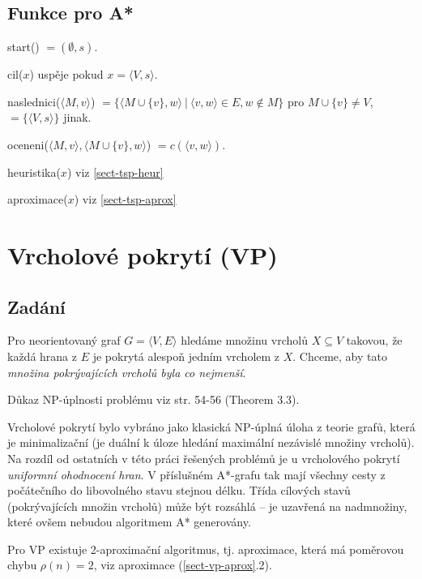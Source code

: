 \documentclass[12pt,notitlepage,fleqn]{report} %
\theoremstyle{definition}
\def\|{\:|\:}
\newcommand{\nt}[1]{\langle #1 \rangle} %
\begin{document}
    \subsection{Funkce pro A*}
    \label{sect-tsp-func}
    \begin{compactdesc}
     \item[start()] $=(\emptyset, s)$.
     \item[cil($x$)] uspěje pokud $x=\nt{V,s}$.
     \item[naslednici($\nt{M,v}$)] $= \{ \nt{M \cup \{v\}, w} \| \nt{v,w} \in E, w \notin M \}$ pro $M \cup \{v\} \neq V$, \\
      $= \{ \nt{V,s} \}$ jinak.
     \item[oceneni($\nt{M,v},\nt{M \cup \{v\},w}$)] $= c(\nt{v,w})$.
     \item[heuristika($x$)] viz \ref{sect-tsp-heur}
     \item[aproximace($x$)] viz \ref{sect-tsp-aprox}
    \end{compactdesc}

  \section{Vrcholové pokrytí (VP)}
    \subsection{Zadání}
    Pro neorientovaný graf $G=\nt{V,E}$ hledáme množinu vrcholů $X \subseteq V$ takovou, že každá hrana z $E$ je pokrytá alespoň jedním vrcholem z $X$. Chceme, aby tato \emph{množina pokrývajících vrcholů byla co nejmenší}. 

    Důkaz NP-úplnosti problému viz \cite{garey} str. 54-56 (Theorem 3.3).
    
    Vrcholové pokrytí bylo vybráno jako klasická NP-úplná úloha z teorie grafů, která je minimalizační (je duální k úloze hledání maximální nezávislé množiny vrcholů). Na rozdíl od ostatních v této práci řešených problémů je u vrcholového pokrytí \emph{uniformní ohodnocení hran}. V příslušném A*-grafu tak mají všechny cesty z počátečního do libovolného stavu stejnou délku. Třída cílových stavů (pokrývajících množin vrcholů) může být rozsáhlá -- je uzavřená na nadmnožiny, které ovšem nebudou algoritmem A* generovány.
    
    Pro VP existuje 2-aproximační algoritmus, tj. aproximace, která má poměrovou chybu $\rho(n)=2$, viz aproximace (\ref{sect-vp-aprox}.2).
\end{document}
